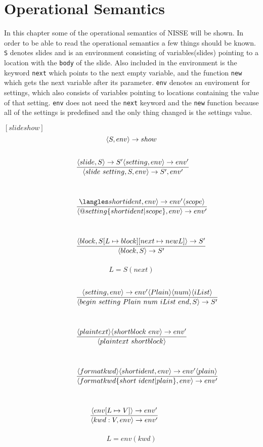 \chapter{Operational Semantics}
In this chapter some of the operational semantics of NISSE will be shown. In order to be able to read the operational semantics a few things should be known. \texttt{S} denotes slides and is an environment consisting of variables(slides) pointing to a location with the \texttt{body} of the slide. Also included in the environment is the keyword \texttt{next} which points to the next empty variable, and the function \texttt{new} which gets the next variable after its parameter. \texttt{env} denotes an enviroment for settings, which also consists of variables pointing to locations containing the value of that setting. \texttt{env} does not need the \texttt{next} keyword and the \texttt{new} function because all of the settings is predefined and the only thing changed is the settings value.

$[slideshow]$
\[ \langle S, env \rangle \rightarrow show \]

\noindent{$[specification]$}
\[ \condinfrule{\langle slide, S \rangle \ra S' \langle setting, env \rangle \ra env'} { \langle slide~setting, S, env \rangle \ra S', env'}{} \]

\noindent{$[setting]$}
\[ \condinfrule{\langles shortident, env \rangle \ra env' \langle scope \rangle} { \langle @ setting \{ shortident | scope \}, env \rangle \ra env'}{} \]

\noindent{$[slide]$}
\[ \condinfrule{\langle block, S[L \mapsto block] [next \mapsto new L] \rangle \ra S'} { \langle block, S \rangle \ra S'}{} \]
\[ L = S(next)\]

\noindent{$[block]$}
\[ \condinfrule{\langle setting, env \rangle \ra env' \langle Plain \rangle \langle num \rangle \langle iList \rangle} { \langle begin~setting~Plain~num~iList~end, S \rangle \ra S'}{} \]

\noindent{$[plain]$}
\[ \condinfrule{\langle plaintext \rangle \langle shortblock~env \rangle \ra env'} { \langle plaintext~shortblock \rangle }{} \]

\noindent{$[shortblock]$}
\[ \condinfrule{\langle formatkwd \rangle \langle shortident, env \rangle \ra env' \langle plain \rangle} { \langle formatkwd \{short~ident | plain\}, env \rangle \ra env'}{} \]

\noindent{$[shortident]$}
\[ \condinfrule{\langle env [L \mapsto V] \rangle \ra env'} { \langle kwd : V, env \rangle \ra env'}{} \]
\[ L = env(kwd)\]